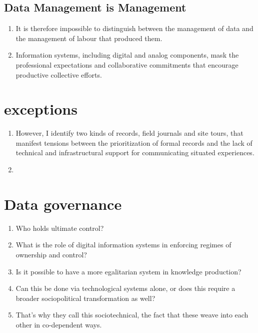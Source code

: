 \documentclass{article}
\begin{document}
\subsection{Data Management is Management}
\begin{enumerate}
  \item It is therefore impossible to distinguish between the management of data and the management of labour that produced them.
  \item Information systems, including digital and analog components, mask the professional expectations and collaborative commitments that encourage productive collective efforts.
\end{enumerate}

\section{exceptions}
\begin{enumerate}
  \item However, I identify two kinds of records, field journals and site tours, that manifest tensions between the prioritization of formal records and the lack of technical and infrastructural support for communicating situated experiences.
  \item 
\end{enumerate}




\section{Data governance}
\begin{enumerate}
  \item Who holds ultimate control?
  \item What is the role of digital information systems in enforcing regimes of ownership and control?
  \item Is it possible to have a more egalitarian system in knowledge production?
  \item Can this be done via technological systems alone, or does this require a broader sociopolitical transformation as well?
  \item That's why they call this sociotechnical, the fact that these weave into each other in co-dependent ways.
\end{enumerate}
\end{document}
